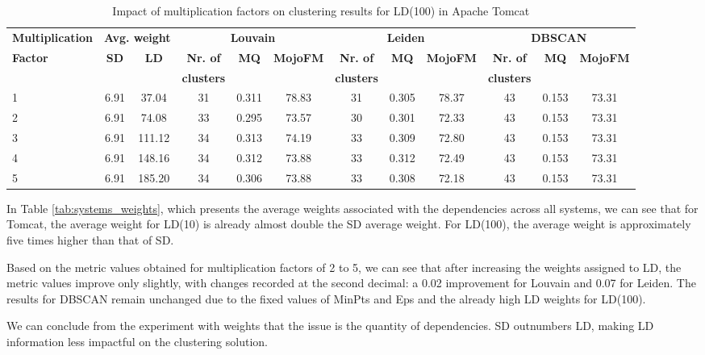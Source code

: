 \documentclass{ieeeaccess}
\begin{document}
\begin{table}[htbp]
\centering
\setlength{\tabcolsep}{7pt}
\begin{tabular}{|l|c|c|ccc|ccc|ccc|}
\hline
\textbf{Multiplication} & \multicolumn{2}{c|}{\textbf{Avg. weight}} & \multicolumn{3}{c|}{\textbf{Louvain}} & \multicolumn{3}{c|}{\textbf{Leiden}} & \multicolumn{3}{c|}{\textbf{DBSCAN}} \\
\cline{4-12}
\textbf{Factor} & \textbf{SD} & \textbf{LD} & \textbf{Nr. of} & \textbf{MQ} & \textbf{MojoFM} & \textbf{Nr. of} & \textbf{MQ} & \textbf{MojoFM} & \textbf{Nr. of} & \textbf{MQ} & \textbf{MojoFM} \\
&  &  & \textbf{clusters} & &  & \textbf{clusters} & && \textbf{clusters} &  & \\
\hline
1 & 6.91  & 37.04  & 31 & 0.311 & 78.83 & 31 & 0.305 & 78.37 & 43 & 0.153 & 73.31 \\
2 & 6.91  & 74.08  & 33 & 0.295 & 73.57 & 30 & 0.301 & 72.33 & 43 & 0.153 & 73.31 \\
3 & 6.91  & 111.12 & 34 & 0.313 & 74.19 & 33 & 0.309 & 72.80 & 43 & 0.153 & 73.31 \\
4 & 6.91  & 148.16 & 34 & 0.312 & 73.88 & 33 & 0.312 & 72.49 & 43 & 0.153 & 73.31 \\
5 & 6.91  & 185.20 & 34 & 0.306 & 73.88 & 33 & 0.308 & 72.18 & 43 & 0.153 & 73.31 \\
\hline
\end{tabular}
\caption{Impact of multiplication factors on clustering results for LD(100) in Apache Tomcat}
\label{tab:clustering_results_multiplication}
\end{table}


In Table \ref{tab:systems_weights}, which presents the average weights associated with the dependencies across all systems, we can see that for Tomcat, the average weight for LD(10) is already almost double the SD average weight. For LD(100), the average weight is approximately five times higher than that of SD.

Based on the metric values obtained for multiplication factors of 2 to 5, we can see that after increasing the weights assigned to LD, the metric values improve only slightly, with changes recorded at the second decimal: a 0.02 improvement for Louvain and 0.07 for Leiden. The results for DBSCAN remain unchanged due to the fixed values of MinPts and Eps and the already high LD weights for LD(100).

We can conclude from the experiment with weights that the issue is the quantity of dependencies. SD outnumbers LD, making LD information less impactful on the clustering solution.
\end{document}
